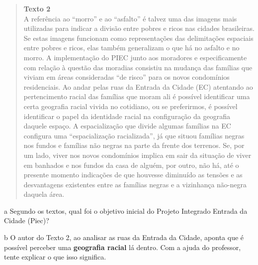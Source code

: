 \begin{quote}
\textbf{Texto 2}\\
A referência ao ``morro'' e ao ``asfalto'' é talvez uma das imagens mais
utilizadas para indicar a divisão entre pobres e ricos nas cidades
brasileiras. Se estas imagens funcionam como representações das
delimitações espaciais entre pobres e ricos, elas também generalizam o
que há no asfalto e no morro. A implementação do PIEC junto aos
moradores e especificamente com relação à questão das moradias consistiu
na mudança das famílias que viviam em áreas consideradas ``de risco''
para os novos condomínios residenciais. Ao andar pelas ruas da Entrada
da Cidade (EC) atentando ao pertencimento racial das famílias que moram
ali é possível identificar uma certa geografia racial vivida no
cotidiano, ou se preferirmos, é possível identificar o papel da
identidade racial na configuração da geografia daquele espaço. A
espacialização que divide algumas famílias na EC configura uma
``espacialização racializada'', já que situou famílias negras nos fundos
e famílias não negras na parte da frente dos terrenos. Se, por um lado,
viver nos novos condomínios implica em sair da situação de viver em
banhados e nos fundos da casa de alguém, por outro, não há, até o
presente momento indicações de que houvesse diminuído as tensões e as
desvantagens existentes entre as famílias negras e a vizinhança
não-negra daquela área.

\end{quote}

\num{a} Segundo os textos, qual foi o objetivo inicial do Projeto Integrado
Entrada da Cidade (Piec)?


\num{b} O autor do Texto 2, ao analisar as ruas da Entrada da Cidade, aponta que
é possível perceber uma \textbf{geografia racial} lá dentro. Com a ajuda
do professor, tente explicar o que isso significa.


